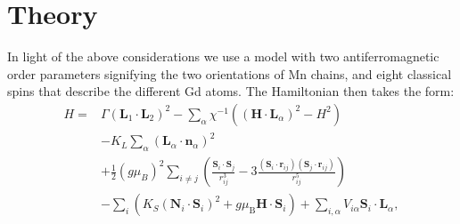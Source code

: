 \section{Theory}
In light of the above considerations we use a model with two antiferromagnetic order parameters signifying the two orientations of Mn chains, and eight classical spins that describe the different Gd atoms. The Hamiltonian then takes the form:
\begin{align}
    \label{eq:GdMn2O5_1}
    H=&\Gamma(\mathbf{L}_1\cdot \mathbf{L}_2)^2
    -\sum_{\alpha}\chi^{-1}((\mathbf{H}\cdot \mathbf{L}_\alpha)^2-H^2)\\
    &-K_L\sum_\alpha(\mathbf{L}_\alpha\cdot \mathbf{n}_\alpha)^2\\
    &+\frac{1}{2}(g \mu_B)^2\sum_{i\neq j}\left(\frac{\mathbf{S}_i\cdot \mathbf{S}_j}{r_{ij}^3}-3\frac{(\mathbf{S}_i\cdot \mathbf{r}_{ij})(\mathbf{S}_j\cdot \mathbf{r}_{ij})}{r_{ij}^5}\right)\\
    &-\sum_i\left( K_S(\mathbf{N}_i\cdot \mathbf{S}_i)^2 + g\mu_\mathrm{B} \mathbf{H} \cdot \mathbf{S}_i\right) + \sum_{i,\alpha}V_{i\alpha}\mathbf{S}_i\cdot \mathbf{L}_\alpha,
\end{align}

